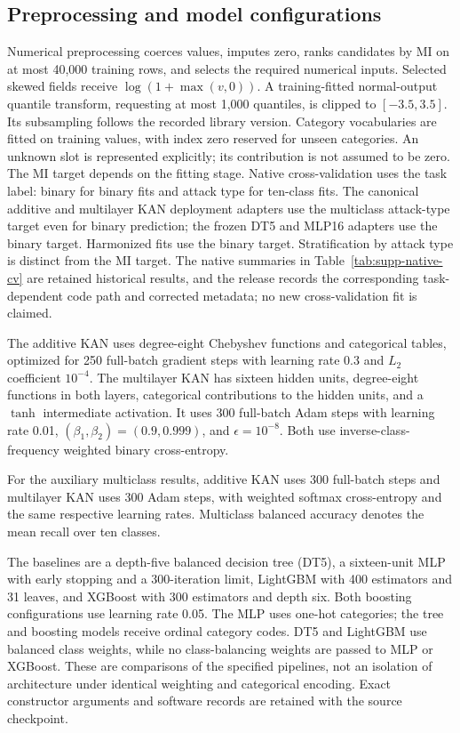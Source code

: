 \documentclass{ieeeaccess}
\begin{document}
\subsection{Preprocessing and model configurations}
Numerical preprocessing coerces values, imputes zero, ranks candidates by MI on at most 40,000 training rows, and selects the required numerical inputs. Selected skewed fields receive $\log(1+\max(v,0))$. A training-fitted normal-output quantile transform, requesting at most 1,000 quantiles, is clipped to $[-3.5,3.5]$. Its subsampling follows the recorded library version. Category vocabularies are fitted on training values, with index zero reserved for unseen categories. An unknown slot is represented explicitly; its contribution is not assumed to be zero. The MI target depends on the fitting stage. Native cross-validation uses the task label: binary for binary fits and attack type for ten-class fits. The canonical additive and multilayer KAN deployment adapters use the multiclass attack-type target even for binary prediction; the frozen DT5 and MLP16 adapters use the binary target. Harmonized fits use the binary target. Stratification by attack type is distinct from the MI target. The native summaries in Table~\ref{tab:supp-native-cv} are retained historical results, and the release records the corresponding task-dependent code path and corrected metadata; no new cross-validation fit is claimed.

The additive KAN uses degree-eight Chebyshev functions and categorical tables, optimized for 250 full-batch gradient steps with learning rate 0.3 and $L_2$ coefficient $10^{-4}$. The multilayer KAN has sixteen hidden units, degree-eight functions in both layers, categorical contributions to the hidden units, and a $\tanh$ intermediate activation. It uses 300 full-batch Adam steps with learning rate 0.01, $(\beta_1,\beta_2)=(0.9,0.999)$, and $\epsilon=10^{-8}$. Both use inverse-class-frequency weighted binary cross-entropy.

For the auxiliary multiclass results, additive KAN uses 300 full-batch steps and multilayer KAN uses 300 Adam steps, with weighted softmax cross-entropy and the same respective learning rates. Multiclass balanced accuracy denotes the mean recall over ten classes.

The baselines are a depth-five balanced decision tree (DT5), a sixteen-unit MLP with early stopping and a 300-iteration limit, LightGBM with 400 estimators and 31 leaves, and XGBoost with 300 estimators and depth six. Both boosting configurations use learning rate 0.05. The MLP uses one-hot categories; the tree and boosting models receive ordinal category codes. DT5 and LightGBM use balanced class weights, while no class-balancing weights are passed to MLP or XGBoost. These are comparisons of the specified pipelines, not an isolation of architecture under identical weighting and categorical encoding. Exact constructor arguments and software records are retained with the source checkpoint.
\end{document}
